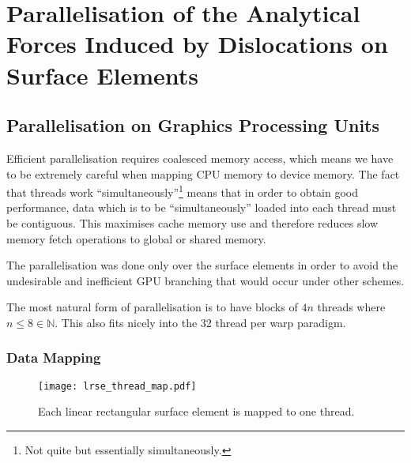 \chapter{Parallelisation of the Analytical Forces Induced by Dislocations on Surface Elements}
\label{c:para_f_dln_se}
%
\section{Parallelisation on Graphics Processing Units}
Efficient parallelisation requires coalesced memory access, which means we have to be extremely careful when mapping CPU memory to device memory. The fact that threads work ``simultaneously''\footnote{Not quite but essentially simultaneously.} means that in order to obtain good performance, data which is to be ``simultaneously'' loaded into each thread must be contiguous. This maximises cache memory use and therefore reduces slow memory fetch operations to global or shared memory.

The parallelisation was done only over the surface elements in order to avoid the undesirable and inefficient GPU branching that would occur under other schemes.

The most natural form of parallelisation is to have blocks of $ 4n $ threads where $ n \leq 8 \in \mathbb{N}$. This also fits nicely into the 32 thread per warp paradigm.
%
\subsection{Data Mapping}
%
\begin{figure}
	\centering
	\texttt{[image: lrse\_thread\_map.pdf]}
	\caption[Linear rectangular surface element mapping.]{Each linear rectangular surface element is mapped to one thread.}
	\label{f:lrse_map}
\end{figure}
%
